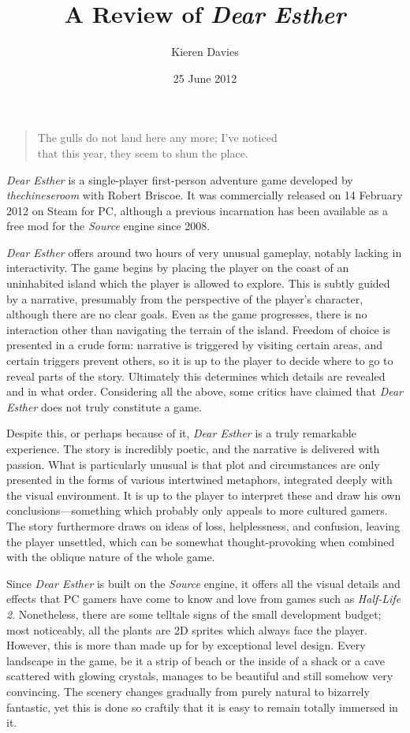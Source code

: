 \documentclass[a4paper,12pt]{article}
\begin{document}
\title{A Review of \emph{Dear Esther}}
\author{Kieren Davies}
\date{25 June 2012}
\maketitle

\begin{quote}
\centering \Fontlukas \large
The gulls do not land here any more; I've noticed \\
that this year, they seem to shun the place.
\end{quote}

\emph{Dear Esther} is a single-player first-person adventure game developed by \emph{thechineseroom} with Robert Briscoe.  It was commercially released on 14 February 2012 on Steam for PC, although a previous incarnation has been available as a free mod for the \emph{Source} engine since 2008.

\emph{Dear Esther} offers around two hours of very unusual gameplay, notably lacking in interactivity.  The game begins by placing the player on the coast of an uninhabited island which the player is allowed to explore.  This is subtly guided by a narrative, presumably from the perspective of the player's character, although there are no clear goals.  Even as the game progresses, there is no interaction other than navigating the terrain of the island.  Freedom of choice is presented in a crude form: narrative is triggered by visiting certain areas, and certain triggers prevent others, so it is up to the player to decide where to go to reveal parts of the story.  Ultimately this determines which details are revealed and in what order.  Considering all the above, some critics have claimed that \emph{Dear Esther} does not truly constitute a game.

Despite this, or perhaps because of it, \emph{Dear Esther} is a truly remarkable experience.  The story is incredibly poetic, and the narrative is delivered with passion.  What is particularly unusual is that plot and circumstances are only presented in the forms of various intertwined metaphors, integrated deeply with the visual environment.  It is up to the player to interpret these and draw his own conclusions---something which probably only appeals to more cultured gamers.  The story furthermore draws on ideas of loss, helplessness, and confusion, leaving the player unsettled, which can be somewhat thought-provoking when combined with the oblique nature of the whole game.

Since \emph{Dear Esther} is built on the \emph{Source} engine, it offers all the visual details and effects that PC gamers have come to know and love from games such as \emph{Half-Life 2}.  Nonetheless, there are some telltale signs of the small development budget; most noticeably, all the plants are 2D sprites which always face the player.  However, this is more than made up for by exceptional level design.  Every landscape in the game, be it a strip of beach or the inside of a shack or a cave scattered with glowing crystals, manages to be beautiful and still somehow very convincing.  The scenery changes gradually from purely natural to bizarrely fantastic, yet this is done so craftily that it is easy to remain totally immersed in it.
\end{document}
